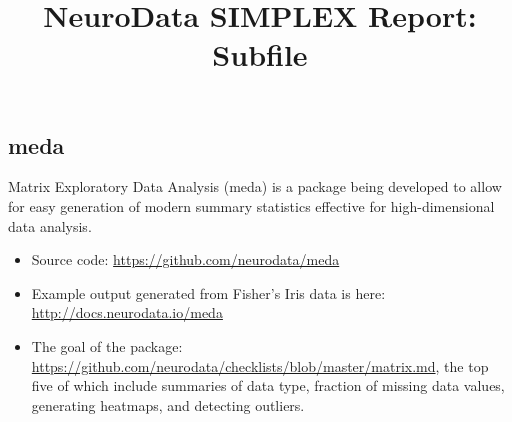 \documentclass[simplex.tex]{subfiles}
\title{NeuroData SIMPLEX Report: Subfile}
\begin{document}


\subsection{meda}

Matrix Exploratory Data Analysis (meda) is a package being developed to
allow for easy generation of modern summary statistics effective for
high-dimensional data analysis. 

\begin{itemize}
  \item Source code: \href{https://github.com/neurodata/meda}{https://github.com/neurodata/meda}
  \item Example output generated from Fisher's Iris data is here:
    \href{http://docs.neurodata.io/meda}{http://docs.neurodata.io/meda}
  \item The goal of the package:
    \href{https://github.com/neurodata/checklists/blob/master/matrix.md}{https://github.com/neurodata/checklists/blob/master/matrix.md}, the top five of which include summaries of data type, fraction of missing data values, generating heatmaps, and detecting outliers.
\end{itemize}
\end{document}
